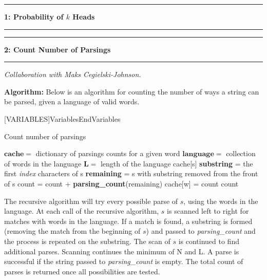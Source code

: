 \documentclass[11pt]{article}
\newcommand\question[2]{\vspace{.25in}\hrule\textbf{#1: #2}\vspace{.5em}\hrule\vspace{.10in}}
\newcommand\algorith{\vspace{.10in}\textbf{Algorithm: }}
\begin{document}
\raggedright
\newcommand\NAME{Jake Pitkin}  %
\newcommand\UID{u0891770}     %
\newcommand\HWNUM{2}              %

\question{1}{Probability of $k$ Heads}

\question{2}{Count Number of Parsings}
\textit{Collaboration with Maks Cegielski-Johnson.}

\algorith Below is an algorithm for counting the number of ways a string can be parsed, given a language of valid words.

[VARIABLES]{Variables}{EndVariables}
   {\algorithmicvariables}
   {\algorithmicend\ \algorithmicvariables}

\begin{algorithm}[H]
\caption{Count number of parsings}
\label{CHalgorithm}
\begin{algorithmic}[1]
\Variables
\State $\mathbf{cache} = $ dictionary of parsings counts for a given word
\State $\mathbf{language} =$ collection of words in the language
\State $\mathbf{L} =$ length of the language
\EndVariables
\State
{}
	\State {}
\EndIf
\State
{}
	\State \Return cache[s]
\EndIf
\State
{}
	\State \textbf{substring} = the first \textit{index} characters of s
		\State \textbf{remaining} = s with substring removed from the front of s
		\State count = count + \textbf{parsing\_count}(remaining)
	\EndIf
\EndFor
\State
\State cache[w] = count
\State \Return count
\EndProcedure
\end{algorithmic}
\end{algorithm}

The recursive algorithm will try every possible parse of $s$, using the words in the language. At each call of the recursive algorithm, $s$ is scanned left to right for matches with words in the language. If a match is found, a substring is formed (removing the match from the beginning of $s$) and passed to \textit{parsing\_count} and the process is repeated on the substring. The scan of $s$ is continued to find additional parses. Scanning continues the minimum of N and L. A parse is successful if the string passed to \textit{parsing\_count} is empty. The total count of parses is returned once all possibilities are tested.
\end{document}
